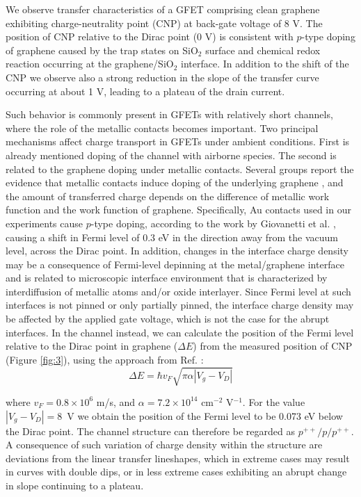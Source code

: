 \documentclass[review]{elsarticle}
\begin{document}
We observe transfer characteristics of a GFET comprising clean graphene exhibiting charge-neutrality point (CNP) at back-gate voltage of 8 V.
  The position of CNP relative to the Dirac point (0 V) is consistent with $p$-type doping of graphene caused by the trap states on SiO$_{2}$ surface and chemical redox reaction occurring at the graphene/SiO$_{2}$ interface\cite{feng-2014,peng-2017,lafkioti-2010}.
  In addition to the shift of the CNP we observe also a strong reduction in the slope of the transfer curve occurring at about 1 V, leading to a plateau of the drain current.

  Such behavior is commonly present in GFETs with relatively short channels, where the role of the metallic contacts becomes important\cite{bartolomeo-2015,nouchi-2008,nouchi-2014}.
 Two principal mechanisms  affect charge transport in GFETs under ambient conditions.
 First is already mentioned doping of the channel with airborne species.
 The second is related to the graphene doping under metallic contacts\cite{farmer-2009,giovannetti-2008,lee-2008,mueller-2009}.
  Several groups report the evidence that metallic contacts induce doping of the underlying graphene \cite{giovannetti-2008,mueller-2009,huard-2008}, and the amount of transferred charge depends on the difference of metallic work function and the work function of graphene.
  Specifically, Au contacts used in our experiments cause $p$-type doping, according to the work by Giovanetti et al.
\cite{giovannetti-2008}, causing a shift in Fermi level of 0.3 eV in the direction away from the vacuum level, across the Dirac point.
 In addition, changes in the interface charge density may be a consequence of Fermi-level depinning at the metal/graphene interface and is related to microscopic interface environment that is characterized by interdiffusion of metallic atoms and/or oxide interlayer\cite{nouchi-2008,nouchi-2014}.
 Since Fermi level at such interfaces is not pinned or only partially pinned\cite{dibartolomeo-2011}, the interface charge density may be affected by the applied gate voltage, which is not the case for the abrupt interfaces.
  In the channel instead, we can calculate the position of the Fermi level relative to the Dirac point in graphene ($\Delta E$) from the measured position of CNP (Figure \ref{fig:3}), using the approach from Ref.
 \cite{wang-2008}:
\begin{equation}
  \label{eq:1}
  \Delta E = \hbar v_{F}\sqrt{\pi\alpha|V_{g}-V_{D}|}
\end{equation}

\noindent where $v_F=0.
8\times10^6$ m/s, and $\alpha=7.
2\times10^{14}$ cm$^{-2}$ V$^{-1}$.
 For the value $|V_g-V_D |=8$~V we obtain the position of the Fermi level to be 0.073 eV below the Dirac point.
 The channel structure can therefore be regarded as $p^{++}/p/p^{++}$.
 A consequence of such variation of charge density within the structure are deviations from the linear transfer lineshapes, which in extreme cases may result in curves  with double dips\cite{nouchi-2014,nam-2012}, or in less extreme cases exhibiting an abrupt change in slope continuing to a plateau.
 
\end{document}
